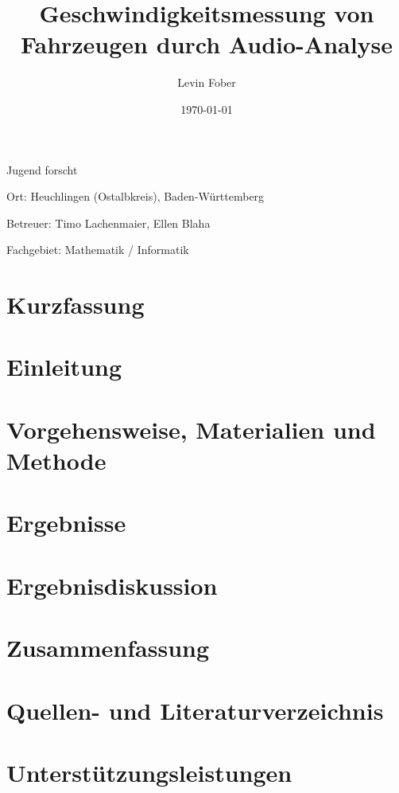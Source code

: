 \documentclass[12pt, a4paper]{article}
\title{\textbf{Geschwindigkeitsmessung von Fahrzeugen durch Audio-Analyse}}
\author{Levin Fober}
\date{\today}
\begin{document}
\maketitle
\begin{center}
    Jugend forscht

    Ort: Heuchlingen (Ostalbkreis), Baden-Württemberg

    Betreuer: Timo Lachenmaier, Ellen Blaha

    Fachgebiet: Mathematik / Informatik
\end{center}

\newpage

\thispagestyle{plain}

\section*{Kurzfassung}

\newpage

\thispagestyle{plain}

\tableofcontents

\newpage

\listoftodos

\thispagestyle{plain}

\section{Einleitung}


\section{Vorgehensweise, Materialien und Methode}


\section{Ergebnisse}

\section{Ergebnisdiskussion}

\section{Zusammenfassung}

\section{Quellen- und Literaturverzeichnis}

\printbibliography

\section{Unterstützungsleistungen}
\end{document}
